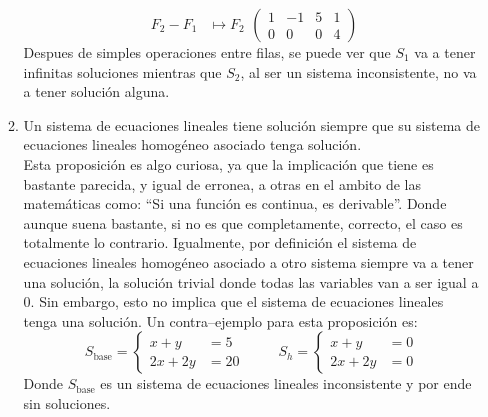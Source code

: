 \documentclass{article}
\begin{document}
\begin{enumerate}
\begin{enumerate}[label=\listAlph]
\[                    \begin{aligned}
                        F_2 - F_1 &\mapsto F_2
                    \end{aligned}
                    \left(
                    \begin{array}{cc|cc}
                        1 & -1 & 5  & 1 \\
                        0 & 0 & 0  & 4
                    \end{array}
                    \right)
                \]
                Despues de simples operaciones entre filas, se puede ver que \(S_1\) va a tener infinitas soluciones mientras que 
                \(S_2\), al ser un sistema inconsistente, no va a tener solución alguna.

			\item Un sistema de ecuaciones lineales tiene solución siempre que su sistema de ecuaciones lineales homogéneo asociado tenga solución. \\
                Esta proposición es algo curiosa, ya que la implicación que tiene es bastante parecida, y igual de erronea, a otras en el ambito de las matemáticas como:
                \enquote{Si una función es continua, es derivable}. Donde aunque suena bastante, si no es que completamente, correcto, el caso es totalmente lo contrario.
                Igualmente, por definición el sistema de ecuaciones lineales homogéneo asociado a otro sistema siempre va a tener una solución, la solución trivial donde todas
                las variables van a ser igual a 0. Sin embargo, esto no implica que el sistema de ecuaciones lineales tenga una solución. Un contra--ejemplo para esta proposición es:
                \[
                    S_{\text{base}} =
                    \left\{
                        \begin{aligned}
                            x + y &= 5 \\
                            2x + 2y &= 20 
                        \end{aligned}
                    \right.
                    \hspace{1cm}
                    S_{h} = 
                    \left\{
                        \begin{aligned}
                            x + y &= 0 \\
                            2x + 2y &= 0 
                        \end{aligned}
                    \right.
                \]
                Donde \(S_{\text{base}}\) es un sistema de ecuaciones lineales inconsistente y por ende sin soluciones.

\end{enumerate}
\end{enumerate}
\end{document}
